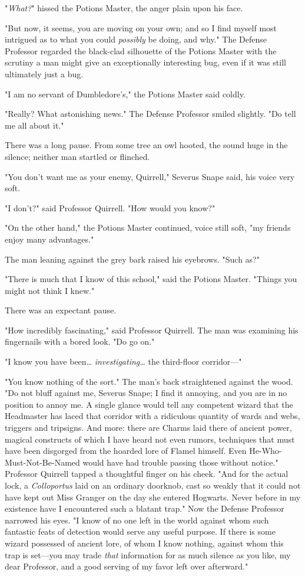 "\emph{What?}" hissed the Potions Master, the anger plain upon his face.

"But now, it seems, you are moving on your own; and so I find myself most 
intrigued as to what you could \emph{possibly} be doing, and why." The Defense 
Professor regarded the black-clad silhouette of the Potions Master with the 
scrutiny a man might give an exceptionally interesting bug, even if it was 
still ultimately just a bug.

"I am no servant of Dumbledore's," the Potions Master said coldly.

"Really? What astonishing news." The Defense Professor smiled slightly. "Do 
tell me all about it."

There was a long pause. From some tree an owl hooted, the sound huge in the 
silence; neither man startled or flinched.

"You don't want me as your enemy, Quirrell," Severus Snape said, his voice very 
soft.

"I don't?" said Professor Quirrell. "How would you know?"

"On the other hand," the Potions Master continued, voice still soft, "my 
friends enjoy many advantages."

The man leaning against the grey bark raised his eyebrows. "Such as?"

"There is much that I know of this school," said the Potions Master. "Things 
you might not think I knew."

There was an expectant pause.

"How incredibly fascinating," said Professor Quirrell. The man was examining 
his fingernails with a bored look. "Do go on."

"I know you have been{\ldots} \emph{investigating{\ldots}} the third-floor 
corridor---"

"You know nothing of the sort." The man's back straightened against the wood. 
"Do not bluff against me, Severus Snape; I find it annoying, and you are in no 
position to annoy me. A single glance would tell any competent wizard that the 
Headmaster has laced that corridor with a ridiculous quantity of wards and 
webs, triggers and tripsigns. And more: there are Charms laid there of ancient 
power, magical constructs of which I have heard not even rumors, techniques 
that must have been disgorged from the hoarded lore of Flamel himself. Even 
He-Who-Must-Not-Be-Named would have had trouble passing those without notice." 
Professor Quirrell tapped a thoughtful finger on his cheek. "And for the actual 
lock, a \emph{Colloportus} laid on an ordinary doorknob, cast so weakly that it 
could not have kept out Miss Granger on the day she entered Hogwarts. Never 
before in my existence have I encountered such a blatant trap." Now the Defense 
Professor narrowed his eyes. "I know of no one left in the world against whom 
such fantastic feats of detection would serve any useful purpose. If there is 
some wizard possessed of ancient lore, of whom I know nothing, against whom 
this trap is set---you may trade \emph{that} information for as much silence as 
you like, my dear Professor, and a good serving of my favor left over 
afterward."


